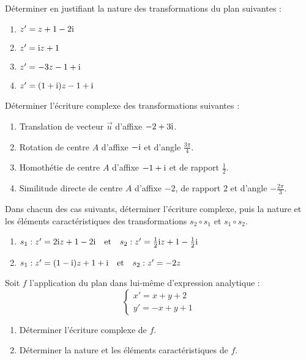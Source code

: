 



 \summary{}
 
\begin{exercice}
D\'eterminer en justifiant la nature des transformations du plan suivantes :
\begin{enumerate}
  \item $z' = z + 1 - 2\text{i}$
  \item $z' = \text{i} z + 1$
  \item $z' = -3z - 1 + \text{i}$
  \item $z' = (1 + \text{i})z - 1 + \text{i}$
\end{enumerate}
\end{exercice}

\begin{exercice}
D\'eterminer l'\'ecriture complexe des transformations suivantes :
\begin{enumerate}
  \item Translation de vecteur $\vec{u}$ d'affixe $-2 + 3\text{i}$.
  \item Rotation de centre $A$ d'affixe $-\text{i}$ et d'angle $\frac{3\pi}{4}$.
  \item Homoth\'etie de centre $A$ d'affixe $-1 + \text{i}$ et de rapport $\frac{1}{2}$.
  \item Similitude directe de centre $A$ d'affixe $-2$, de rapport $2$ et d'angle $-\frac{2\pi}{3}$.
\end{enumerate}
\end{exercice}

\begin{exercice}
Dans chacun des cas suivants, d\'eterminer l'\'ecriture complexe, puis la nature et les \'el\'ements caract\'eristiques des transformations $ s_2\circ s_1 $ et $ s_1\circ s_2 $.
\begin{enumerate}
  \item $s_1 : z' = 2\text{i} z + 1 - 2\text{i} \quad \text{et} \quad s_2 : z' = \frac{1}{2}\text{i} z + 1 - \frac{1}{2}\text{i}$
  \item $s_1 : z' = (1 - \text{i})z + 1 + \text{i} \quad \text{et} \quad s_2 : z' = -2z$
\end{enumerate}
\end{exercice}

\begin{exercice}
Soit $f$ l'application du plan dans lui-m\^eme d'expression analytique : 
\[\begin{cases} x' = x + y + 2 \\ y' = -x + y + 1 \end{cases}\]
\begin{enumerate}
  \item D\'eterminer l'\'ecriture complexe de $f$.
  \item D\'eterminer la nature et les \'el\'ements caract\'eristiques de $f$.
\end{enumerate}
\end{exercice}

